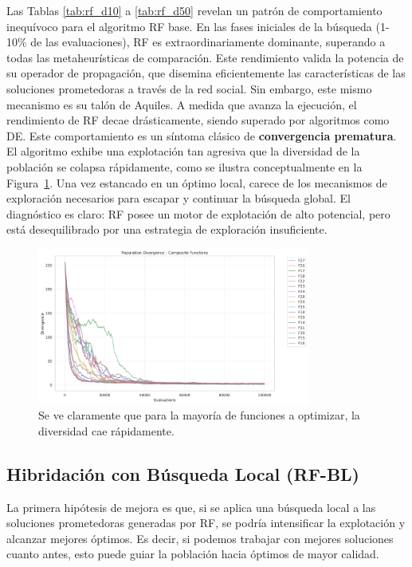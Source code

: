 \documentclass[11pt,a4paper]{article}
\begin{document}
Las Tablas \ref{tab:rf_d10} a \ref{tab:rf_d50} revelan un patrón de comportamiento inequívoco para el algoritmo RF base. En las fases iniciales de la búsqueda (1-10\% de las evaluaciones), RF es extraordinariamente dominante, superando a todas las metaheurísticas de comparación. Este rendimiento valida la potencia de su operador de propagación, que disemina eficientemente las características de las soluciones prometedoras a través de la red social. Sin embargo, este mismo mecanismo es su talón de Aquiles. A medida que avanza la ejecución, el rendimiento de RF decae drásticamente, siendo superado por algoritmos como DE. Este comportamiento es un síntoma clásico de \textbf{convergencia prematura}. El algoritmo exhibe una explotación tan agresiva que la diversidad de la población se colapsa rápidamente, como se ilustra conceptualmente en la Figura~\ref{fig:dist_rf}. Una vez estancado en un óptimo local, carece de los mecanismos de exploración necesarios para escapar y continuar la búsqueda global. El diagnóstico es claro: RF posee un motor de explotación de alto potencial, pero está desequilibrado por una estrategia de exploración insuficiente.
\begin{figure}[h!]
    \centering
    \includegraphics[width=0.8\textwidth]{assets/composite_divergence.png}
    \caption{Se ve claramente que para la mayoría de funciones a optimizar, la diversidad cae rápidamente.}
    \label{fig:dist_rf}
\end{figure}

\subsection{Hibridación con Búsqueda Local (RF-BL)}
La primera hipótesis de mejora es que, si se aplica una búsqueda local a 
las soluciones prometedoras generadas por RF, se podría intensificar la 
explotación y alcanzar mejores óptimos. Es decir, si podemos trabajar con mejores soluciones 
cuanto antes, esto puede guiar la población hacia óptimos de mayor calidad.
\end{document}

